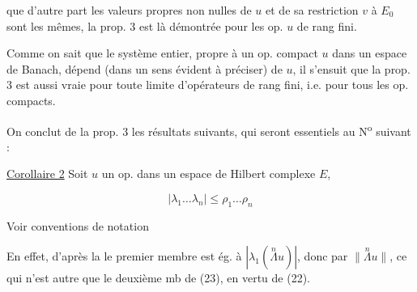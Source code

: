 que d'autre part les valeurs propres non nulles de $u$ et de sa restriction $v$ à $E_0$ sont les mêmes, la prop. 3 est  là démontrée pour les op. $u$ de rang fini.

Comme on sait que le système  entier, propre à un op. compact $u$ dans un espace de Banach, dépend    (dans un sens évident à préciser) de $u$, il s'ensuit que la prop. 3 est aussi vraie pour toute limite d'opérateurs de rang fini, i.e. pour tous les op. compacts.

On conclut de la prop. 3 les résultats suivants, qui seront essentiels au N\textsuperscript{o} suivant : 

\uline{Corollaire 2} Soit $u$ un op.  dans un espace de Hilbert complexe $E$,  

\[
|\lambda_1\ldots\lambda_n|\leq\rho_1\ldots\rho_n\tag*{(23)}
\]


Voir conventions de notation  

En effet, d'après la   le premier membre est ég. à  $|\lambda_1(\overset{n}{\Lambda}u)|$, donc  par $\lVert\overset{n}{\Lambda}u\rVert$,  ce qui n'est autre que le deuxième mb de (23), en vertu de (22).


